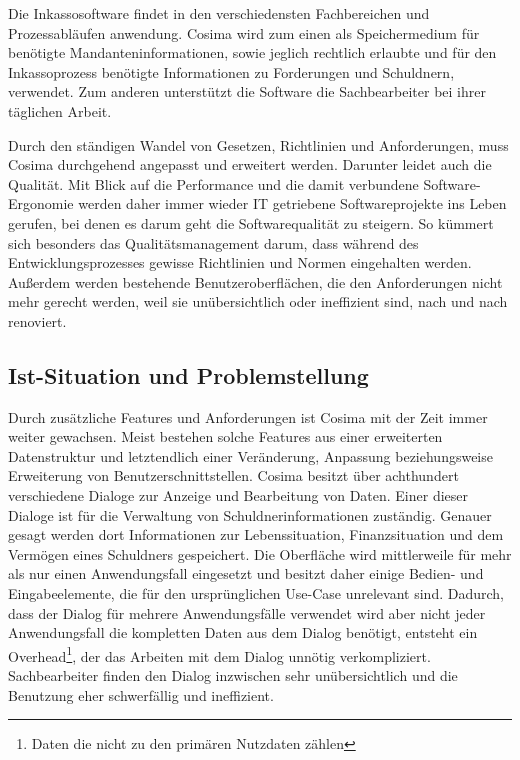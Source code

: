 Die Inkassosoftware findet in den verschiedensten Fachbereichen und Prozessabläufen anwendung. Cosima wird zum einen als Speichermedium für benötigte Mandanteninformationen, sowie jeglich rechtlich erlaubte und für den Inkassoprozess benötigte Informationen zu Forderungen und Schuldnern, verwendet. Zum anderen unterstützt die Software die Sachbearbeiter bei ihrer täglichen Arbeit. 

Durch den ständigen Wandel von Gesetzen, Richtlinien und Anforderungen, muss Cosima durchgehend angepasst und erweitert werden. Darunter leidet auch die Qualität. Mit Blick auf die Performance und die damit verbundene Software-Ergonomie werden daher immer wieder IT getriebene Softwareprojekte ins Leben gerufen, bei denen es darum geht die Softwarequalität zu steigern. So kümmert sich besonders das Qualitätsmanagement darum, dass während des Entwicklungsprozesses gewisse Richtlinien und Normen eingehalten werden. Außerdem werden bestehende Benutzeroberflächen, die den Anforderungen nicht mehr gerecht werden, weil sie unübersichtlich oder ineffizient sind, nach und nach renoviert.


\subsection{Ist-Situation und Problemstellung}
Durch zusätzliche Features und Anforderungen ist Cosima mit der Zeit immer weiter gewachsen. Meist bestehen solche Features aus einer erweiterten Datenstruktur und letztendlich einer Veränderung, Anpassung beziehungsweise Erweiterung von Benutzerschnittstellen. Cosima besitzt über achthundert verschiedene Dialoge zur Anzeige und Bearbeitung von Daten. Einer dieser Dialoge ist für die Verwaltung von Schuldnerinformationen zuständig. Genauer gesagt werden dort Informationen zur Lebenssituation, Finanzsituation und dem Vermögen eines Schuldners gespeichert. Die Oberfläche wird mittlerweile für mehr als nur einen Anwendungsfall eingesetzt und besitzt daher einige Bedien- und Eingabeelemente, die für den ursprünglichen Use-Case unrelevant sind. Dadurch, dass der Dialog für mehrere Anwendungsfälle verwendet wird aber nicht jeder Anwendungsfall die kompletten Daten aus dem Dialog benötigt, entsteht ein Overhead\footnote{Daten die nicht zu den primären Nutzdaten zählen}, der das Arbeiten mit dem Dialog unnötig verkompliziert. Sachbearbeiter finden den Dialog inzwischen sehr unübersichtlich und die Benutzung eher schwerfällig und ineffizient.

